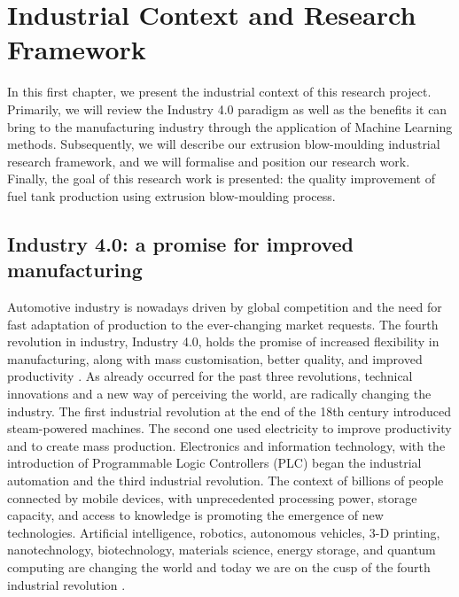 \chapter{Industrial Context and Research Framework} \label{Industrial Context and Research Framework}
\minitoc

In this first chapter, we present the industrial context of this research project. Primarily, we will review the Industry 4.0 paradigm as well as the benefits it can bring to the manufacturing industry through the application of Machine Learning methods. Subsequently, we will describe our extrusion blow-moulding industrial research framework, and we will formalise and position our research work. Finally, the goal of this research work is presented: the quality improvement of fuel tank production using  extrusion blow-moulding process.  

\section{Industry 4.0: a promise for improved manufacturing}

Automotive industry is nowadays driven by global competition and the need for fast adaptation of production to the ever-changing market requests. The fourth revolution in industry, Industry 4.0, holds the promise of increased flexibility in manufacturing, along with mass customisation, better quality, and improved productivity \citep{zhong2017intelligent}. As already occurred for the past three revolutions, technical innovations and a new way of perceiving the world, are radically changing the industry. The first industrial revolution at the end of the 18th century introduced steam-powered machines. The second one used electricity to improve productivity and to create mass production. Electronics and information technology, with the introduction of Programmable Logic Controllers (PLC) began the industrial automation and the third industrial revolution. The context of billions of people connected by mobile devices, with unprecedented processing power, storage capacity, and access to knowledge is promoting the emergence of new technologies. Artificial intelligence, robotics, autonomous vehicles, 3-D printing, nanotechnology, biotechnology, materials science, energy storage, and quantum computing are changing the world and today we are on the cusp of the fourth industrial revolution \citep{schwab20164th}.  

